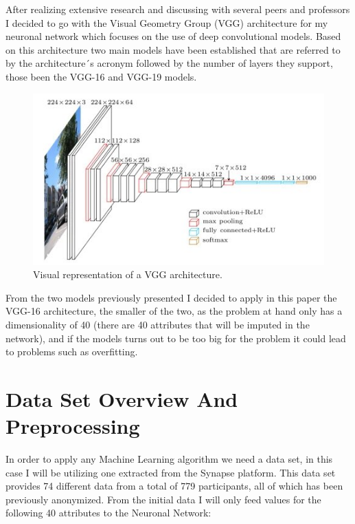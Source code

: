 \documentclass[12pt, a4paper]{article}
\begin{document}
	After realizing extensive research and discussing with several peers and professors I decided to go with the Visual Geometry Group (VGG) architecture for my neuronal network which focuses on the use of deep convolutional models. Based on this architecture two main models have been established that are referred to by the architecture´s acronym followed by the number of layers they support, those been the VGG-16 and VGG-19 models.\cite{VGGinfo}
	
	\vspace{5mm}
	\begin{figure}[H]
		\label{VGGArchitecture}
		\includegraphics[width=140mm]{img/vgg-neural-network-architecture.jpg}
		\caption{Visual representation of a VGG architecture. \cite{VGGimg}}
	\end{figure}
	\vspace{5mm}

	From the two models previously presented I decided to apply in this paper the VGG-16 architecture, the smaller of the two, as the problem at hand only has a dimensionality of 40 (there are 40 attributes that will be imputed in the network), and if the models turns out to be too big for the problem it could lead to problems such as overfitting.
	
	
	\clearpage
	
	\section{Data Set Overview And Preprocessing}
	\label{sec:Data}
	
	In order to apply any Machine Learning algorithm we need a data set, in this case I will be utilizing one extracted from the Synapse platform. This data set provides 74 different data from a total of 779 participants, all of which has been previously anonymized. From the initial data I will only feed values for the following 40 attributes to the Neuronal Network:
	
\end{document}

